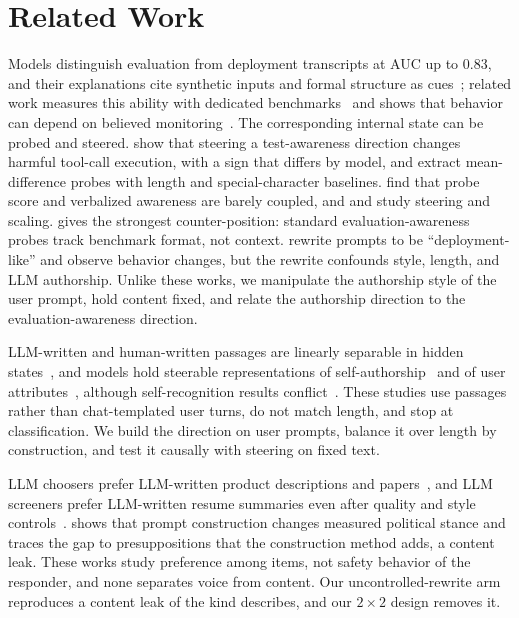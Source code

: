 \section{Related Work}
\label{sec:related}

Models distinguish evaluation from deployment transcripts at AUC up to 0.83, and their explanations cite synthetic inputs and formal structure as cues~\citep{needham2025eval}; related work measures this ability with dedicated benchmarks~\citep{laine2024sad} and shows that behavior can depend on believed monitoring~\citep{greenblatt2024alignment}.
The corresponding internal state can be probed and steered.
\citet{abdelnabi2025hawthorne} show that steering a test-awareness direction changes harmful tool-call execution, with a sign that differs by model, and \citet{nguyen2025probing} extract mean-difference probes with length and special-character baselines.
\citet{heidari2026evalaware} find that probe score and verbalized awareness are barely coupled, and \citet{hua2025steering} and \citet{chaudhary2025scales} study steering and scaling.
\citet{devbunova2026format} gives the strongest counter-position: standard evaluation-awareness probes track benchmark format, not context.
\citet{xiong2025pre} rewrite prompts to be ``deployment-like'' and observe behavior changes, but the rewrite confounds style, length, and LLM authorship.
Unlike these works, we manipulate the authorship style of the user prompt, hold content fixed, and relate the authorship direction to the evaluation-awareness direction.

LLM-written and human-written passages are linearly separable in hidden states~\citep{chen2025repreguard,quaremba2026linear}, and models hold steerable representations of self-authorship~\citep{ackerman2024inspection} and of user attributes~\citep{chen2024dashboard}, although self-recognition results conflict~\citep{panickssery2024self,bai2025know,stamand2026self}.
These studies use passages rather than chat-templated user turns, do not match length, and stop at classification.
We build the direction on user prompts, balance it over length by construction, and test it causally with steering on fixed text.

LLM choosers prefer LLM-written product descriptions and papers~\citep{laurito2025aiai}, and LLM screeners prefer LLM-written resume summaries even after quality and style controls~\citep{xu2025hiring}.
\citet{chalkidis2026templated} shows that prompt construction changes measured political stance and traces the gap to presuppositions that the construction method adds, a content leak.
These works study preference among items, not safety behavior of the responder, and none separates voice from content.
Our uncontrolled-rewrite arm reproduces a content leak of the kind \citet{chalkidis2026templated} describes, and our $2\times2$ design removes it.

